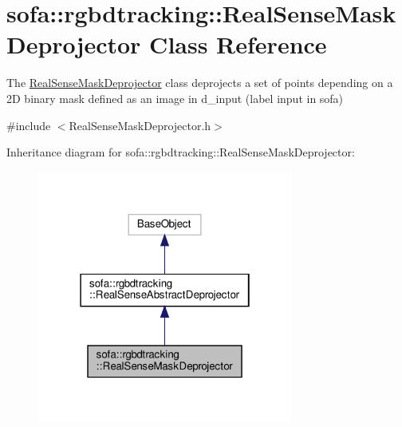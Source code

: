 \hypertarget{classsofa_1_1rgbdtracking_1_1_real_sense_mask_deprojector}{}\section{sofa\+:\+:rgbdtracking\+:\+:Real\+Sense\+Mask\+Deprojector Class Reference}
\label{classsofa_1_1rgbdtracking_1_1_real_sense_mask_deprojector}


The \hyperlink{classsofa_1_1rgbdtracking_1_1_real_sense_mask_deprojector}{Real\+Sense\+Mask\+Deprojector} class deprojects a set of points depending on a 2D binary mask defined as an image in d\+\_\+input (label input in sofa)  




{\ttfamily \#include $<$Real\+Sense\+Mask\+Deprojector.\+h$>$}



Inheritance diagram for sofa\+:\+:rgbdtracking\+:\+:Real\+Sense\+Mask\+Deprojector\+:\nopagebreak
\begin{figure}[H]
\begin{center}
\leavevmode
\includegraphics[width=238pt]{classsofa_1_1rgbdtracking_1_1_real_sense_mask_deprojector__inherit__graph}
\end{center}
\end{figure}


